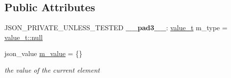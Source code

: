 \subsection*{Public Attributes}
\begin{DoxyCompactItemize}
\item 
\mbox{\label{classnlohmann_1_1basic__json_aa52fb28bbfe1d5484808cad53c35d76c}} 
J\+S\+O\+N\+\_\+\+P\+R\+I\+V\+A\+T\+E\+\_\+\+U\+N\+L\+E\+S\+S\+\_\+\+T\+E\+S\+T\+ED {\bfseries \+\_\+\+\_\+pad3\+\_\+\+\_\+}\+: \hyperlink{namespacenlohmann_1_1detail_a1ed8fc6239da25abcaf681d30ace4985}{value\+\_\+t} m\+\_\+type = \hyperlink{namespacenlohmann_1_1detail_a1ed8fc6239da25abcaf681d30ace4985a37a6259cc0c1dae299a7866489dff0bd}{value\+\_\+t\+::null}
\item 
\mbox{\label{classnlohmann_1_1basic__json_a72f1c0ede41f166429ce3fe7c2ffefc0}} 
json\+\_\+value \hyperlink{classnlohmann_1_1basic__json_a72f1c0ede41f166429ce3fe7c2ffefc0}{m\+\_\+value} = \{\}
\begin{DoxyCompactList}\small\item\em the value of the current element \end{DoxyCompactList}\end{DoxyCompactItemize}
